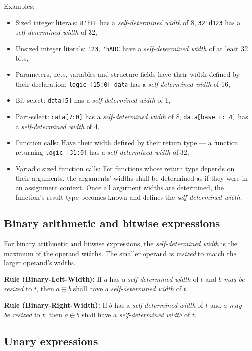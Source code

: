 \documentclass{article}
\newcommand{\sds}{\emph{self-determined width}}
\newcommand{\mbr}{\emph{may be resized}}
\newenvironment{typingrule}[1]%
{\par\noindent\textbf{Rule (#1):} }%
{\par}
\begin{document}
Examples:

\begin{itemize}
  \item Sized integer literals: \verb|8'hFF| has a \sds{} of 8,
    \verb|32'd123| has a \sds{} of 32,
  \item Unsized integer literals: \verb|123|, \verb|'hABC| have a
    \sds{} of at least 32 bits,
  \item Parameters, nets, variables and structure fields have their width
    defined by their declaration: \verb|logic [15:0] data| has a
    \sds{} of 16,
  \item Bit-select: \verb|data[5]| has a \sds{} of 1,
  \item Part-select: \verb|data[7:0]| has a \sds{} of 8,
    \verb|data[base +: 4]| has a \sds{} of 4,
  \item Function calls: Have their width defined by their return type --- a
    function returning \verb|logic [31:0]| has a
    \sds{} of 32,
  \item Variadic sized function calls: For functions whose return type depends
    on their arguments, the arguments' widths shall be determined as if
    they were in an assignment context. Once all argument widths are
    determined, the function's result type becomes known and defines the
    \sds{}.
\end{itemize}

\subsection{Binary arithmetic and bitwise expressions}%

For binary arithmetic and bitwise expressions, the \sds{}
is the maximum of the operand widths. The smaller operand is \emph{resized}
to match the larger operand's widths.

\begin{typingrule}{Binary-Left-Width}
  If $a$ has a \sds{} of $t$ and $b$ \mbr{}
  to $t$, then $a \oplus b$ shall have a \sds{} of $t$.
\end{typingrule}

\begin{typingrule}{Binary-Right-Width}
  If $b$ has a \sds{} of $t$ and $a$ \mbr{}
  to $t$, then $a \oplus b$ shall have a \sds{} of $t$.
\end{typingrule}

\subsection{Unary expressions}%
\end{document}
